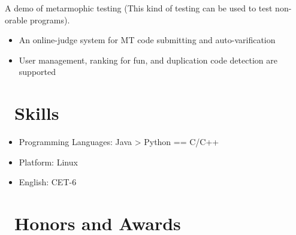 \documentclass{resume}
\begin{document}
A demo of metarmophic testing (This kind of testing can be used to test non-orable programs).
\begin{itemize}
  \item An online-judge system for MT code submitting and auto-varification
  \item User management, ranking for fun, and duplication code detection are supported
\end{itemize}


\section{\faCogs\ Skills}
\begin{itemize}[parsep=0.5ex]
  \item Programming Languages: Java > Python == C/C++
  \item Platform: Linux
  \item English: CET-6
\end{itemize}

\section{\faHeartO\ Honors and Awards}



\end{document}
